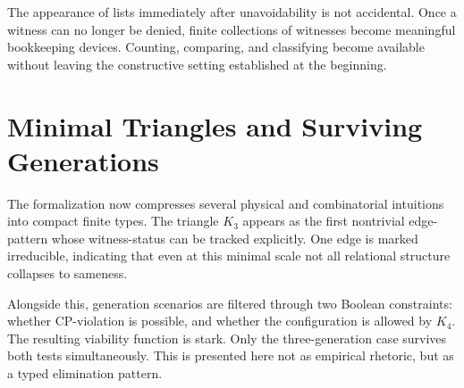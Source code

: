 \documentclass[11pt,a4paper]{book}
\begin{document}
The appearance of lists immediately after unavoidability is not accidental. Once a witness can no longer be denied, finite collections of witnesses become meaningful bookkeeping devices. Counting, comparing, and classifying become available without leaving the constructive setting established at the beginning.

\section{Minimal Triangles and Surviving Generations}

The formalization now compresses several physical and combinatorial intuitions into compact finite types. The triangle $K_3$ appears as the first nontrivial edge-pattern whose witness-status can be tracked explicitly. One edge is marked irreducible, indicating that even at this minimal scale not all relational structure collapses to sameness.

Alongside this, generation scenarios are filtered through two Boolean constraints: whether CP-violation is possible, and whether the configuration is allowed by $K_4$. The resulting viability function is stark. Only the three-generation case survives both tests simultaneously. This is presented here not as empirical rhetoric, but as a typed elimination pattern.
\end{document}
